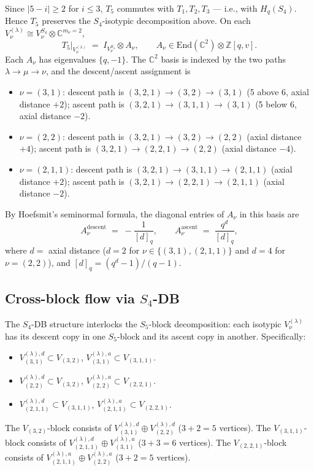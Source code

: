 \documentclass[11pt]{article}
\theoremstyle{definition}
\begin{document}
Since $|5 - i| \geq 2$ for $i \leq 3$, $T_5$ commutes with $T_1, T_2, T_3$ — i.e.,
with $H_q(S_4)$. Hence $T_5$ preserves the $S_4$-isotypic decomposition above.
On each $V_\nu^{(\lambda)} \cong V_\nu^{S_4} \otimes \mathbb{C}^{m_\nu = 2}$,
\[
T_5\bigr|_{V_\nu^{(\lambda)}} \;=\; I_{V_\nu^{S_4}} \otimes A_\nu, \qquad A_\nu \in \mathrm{End}(\mathbb{C}^2) \otimes \mathbb{Z}[q,v].
\]
Each $A_\nu$ has eigenvalues $\{q, -1\}$. The $\mathbb{C}^2$ basis is indexed by
the two paths $\lambda \to \mu \to \nu$, and the descent/ascent assignment is
\begin{itemize}[leftmargin=2em,topsep=0.2em,itemsep=0.1em]
\item $\nu = (3, 1)$: descent path is $(3,2,1) \to (3,2) \to (3,1)$ (5 above 6, axial distance $+2$); ascent path is $(3,2,1) \to (3,1,1) \to (3,1)$ (5 below 6, axial distance $-2$).
\item $\nu = (2, 2)$: descent path is $(3,2,1) \to (3,2) \to (2,2)$ (axial distance $+4$); ascent path is $(3,2,1) \to (2,2,1) \to (2,2)$ (axial distance $-4$).
\item $\nu = (2, 1, 1)$: descent path is $(3,2,1) \to (3,1,1) \to (2,1,1)$ (axial distance $+2$); ascent path is $(3,2,1) \to (2,2,1) \to (2,1,1)$ (axial distance $-2$).
\end{itemize}
By Hoefsmit's seminormal formula, the diagonal entries of $A_\nu$ in this basis are
\[
A_\nu^{\mathrm{descent}} \;=\; -\frac{1}{[d]_q}, \qquad A_\nu^{\mathrm{ascent}} \;=\; \frac{q^d}{[d]_q},
\]
where $d = $ axial distance ($d=2$ for $\nu \in \{(3,1), (2,1,1)\}$ and $d=4$ for
$\nu = (2,2)$), and $[d]_q = (q^d - 1)/(q - 1)$.

\subsection*{Cross-block flow via $S_4$-DB}

The $S_4$-DB structure interlocks the $S_5$-block decomposition: each isotypic
$V_\nu^{(\lambda)}$ has its descent copy in one $S_5$-block and its ascent copy in
another. Specifically:
\begin{itemize}[leftmargin=2em,topsep=0.2em,itemsep=0.1em]
\item $V_{(3,1)}^{(\lambda),d} \subset V_{(3,2)}$, $V_{(3,1)}^{(\lambda),a} \subset V_{(3,1,1)}$.
\item $V_{(2,2)}^{(\lambda),d} \subset V_{(3,2)}$, $V_{(2,2)}^{(\lambda),a} \subset V_{(2,2,1)}$.
\item $V_{(2,1,1)}^{(\lambda),d} \subset V_{(3,1,1)}$, $V_{(2,1,1)}^{(\lambda),a} \subset V_{(2,2,1)}$.
\end{itemize}
The $V_{(3,2)}$-block consists of $V_{(3,1)}^{(\lambda),d} \oplus V_{(2,2)}^{(\lambda),d}$
($3 + 2 = 5$ vertices). The $V_{(3,1,1)}$-block consists of
$V_{(2,1,1)}^{(\lambda),d} \oplus V_{(3,1)}^{(\lambda),a}$ ($3 + 3 = 6$ vertices). The
$V_{(2,2,1)}$-block consists of $V_{(2,1,1)}^{(\lambda),a} \oplus V_{(2,2)}^{(\lambda),a}$
($3 + 2 = 5$ vertices).
\end{document}
